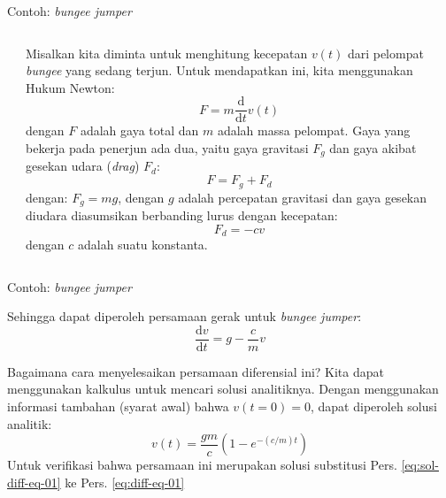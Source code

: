 \begin{frame}{Contoh: \emph{bungee jumper}}
\begin{columns}
\begin{column}{0.2\textwidth}
\end{column}

\begin{column}{0.8\textwidth}
Misalkan kita diminta untuk menghitung kecepatan $v(t)$ dari pelompat
\emph{bungee} yang sedang terjun. Untuk mendapatkan ini, kita
menggunakan Hukum Newton:
\begin{equation*}
F = m \frac{\mathrm{d}}{\mathrm{d}t} v(t)
\end{equation*}
dengan $F$ adalah gaya total dan $m$ adalah massa pelompat.
Gaya yang bekerja pada penerjun ada dua, yaitu gaya gravitasi \(F_{g}\) dan
gaya akibat gesekan udara (\emph{drag})
$F_{d}$:
\begin{equation*}
F = F_{g} + F_{d}
\end{equation*}
dengan: $F_{g} = mg$, dengan $g$ adalah percepatan gravitasi dan gaya
gesekan diudara diasumsikan berbanding lurus dengan kecepatan:
\begin{equation*}
F_{d} = -c v  
\end{equation*}
dengan $c$ adalah suatu konstanta.
\end{column}

\end{columns}

\end{frame}


\begin{frame}{Contoh: \emph{bungee jumper}}

Sehingga dapat diperoleh persamaan gerak untuk \emph{bungee jumper}:
\begin{equation}
\frac{\mathrm{d}v}{\mathrm{d}t} = g - \frac{c}{m}v
\label{eq:diff-eq-01}
\end{equation}

Bagaimana cara menyelesaikan persamaan diferensial ini? Kita dapat
menggunakan kalkulus untuk mencari solusi analitiknya. Dengan
menggunakan informasi tambahan (syarat awal) bahwa $v(t=0)=0$, dapat
diperoleh solusi analitik:
\begin{equation}
v(t) = \frac{gm}{c}\left( 1 - e^{-(c/m)t} \right)
\label{eq:sol-diff-eq-01}
\end{equation}
Untuk verifikasi bahwa
persamaan ini merupakan solusi substitusi
Pers. \eqref{eq:sol-diff-eq-01} ke Pers. \eqref{eq:diff-eq-01}
\end{frame}



